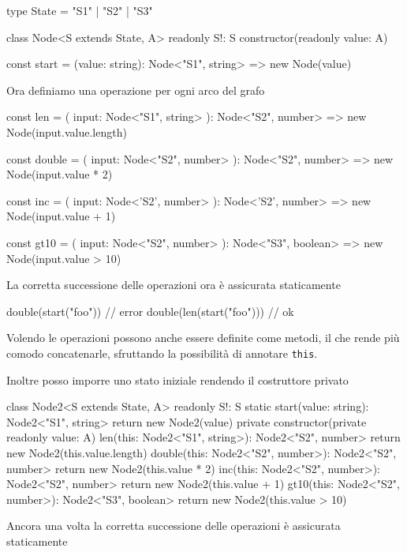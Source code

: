 \documentclass[12pt]{article}
\theoremstyle{definition}
\newenvironment{code}
  {\vspace{0.5cm} \VerbatimEnvironment\begin{typescriptcode}}
  {\end{typescriptcode} \vspace{0.2cm}}
\begin{document}
\begin{code}
type State = "S1" | "S2" | "S3"

class Node<S extends State, A> {
  readonly S!: S
  constructor(readonly value: A) {}
}

const start = (value: string): Node<"S1", string> =>
  new Node(value)
\end{code}

Ora definiamo una operazione per ogni arco del grafo

\begin{code}
const len = (
  input: Node<"S1", string>
): Node<"S2", number> => new Node(input.value.length)

const double = (
  input: Node<"S2", number>
): Node<"S2", number> => new Node(input.value * 2)

const inc = (
  input: Node<'S2', number>
): Node<'S2', number> => new Node(input.value + 1)

const gt10 = (
  input: Node<"S2", number>
): Node<"S3", boolean> => new Node(input.value > 10)
\end{code}

La corretta successione delle operazioni ora è assicurata staticamente

\begin{code}
double(start("foo")) // error
double(len(start("foo"))) // ok
\end{code}

Volendo le operazioni possono anche essere definite come metodi, il che rende più comodo concatenarle,
sfruttando la possibilità di annotare \texttt{this}.

Inoltre posso imporre uno stato iniziale rendendo il costruttore privato

\begin{code}
class Node2<S extends State, A> {
  readonly S!: S
  static start(value: string): Node2<"S1", string> {
    return new Node2(value)
  }
  private constructor(private readonly value: A) {}
  len(this: Node2<"S1", string>): Node2<"S2", number> {
    return new Node2(this.value.length)
  }
  double(this: Node2<"S2", number>): Node2<"S2", number> {
    return new Node2(this.value * 2)
  }
  inc(this: Node2<"S2", number>): Node2<"S2", number> {
    return new Node2(this.value + 1)
  }
  gt10(this: Node2<"S2", number>): Node2<"S3", boolean> {
    return new Node2(this.value > 10)
  }
}
\end{code}

Ancora una volta la corretta successione delle operazioni è assicurata staticamente
\end{document}
